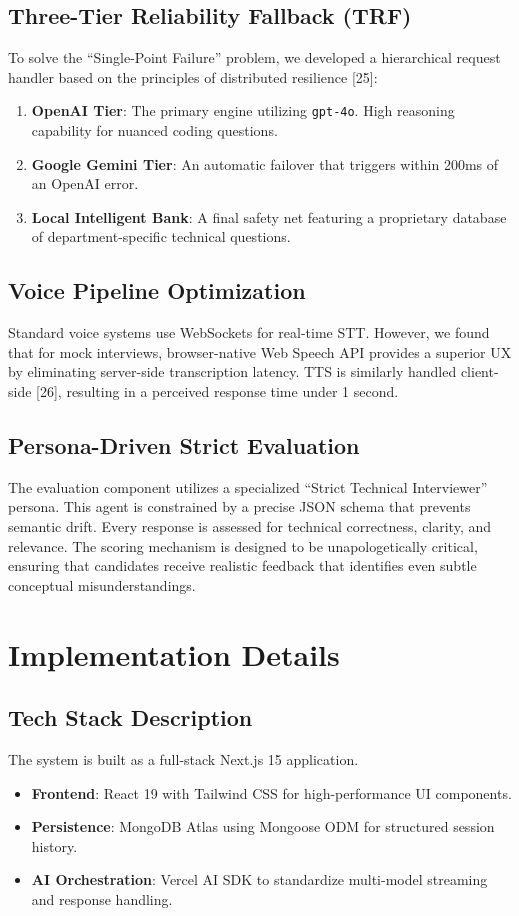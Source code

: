\documentclass[conference]{IEEEtran}
\begin{document}
\subsection{Three-Tier Reliability Fallback (TRF)}
To solve the ``Single-Point Failure'' problem, we developed a hierarchical request handler based on the principles of distributed resilience [25]:
\begin{enumerate}
    \item \textbf{OpenAI Tier}: The primary engine utilizing \texttt{gpt-4o}. High reasoning capability for nuanced coding questions.
    \item \textbf{Google Gemini Tier}: An automatic failover that triggers within 200ms of an OpenAI error.
    \item \textbf{Local Intelligent Bank}: A final safety net featuring a proprietary database of department-specific technical questions.
\end{enumerate}

\subsection{Voice Pipeline Optimization}
Standard voice systems use WebSockets for real-time STT. However, we found that for mock interviews, browser-native Web Speech API provides a superior UX by eliminating server-side transcription latency. TTS is similarly handled client-side [26], resulting in a perceived response time under 1 second.

\subsection{Persona-Driven Strict Evaluation}
The evaluation component utilizes a specialized ``Strict Technical Interviewer'' persona. This agent is constrained by a precise JSON schema that prevents semantic drift. Every response is assessed for technical correctness, clarity, and relevance. The scoring mechanism is designed to be unapologetically critical, ensuring that candidates receive realistic feedback that identifies even subtle conceptual misunderstandings.

\section{Implementation Details}

\subsection{Tech Stack Description}
The system is built as a full-stack Next.js 15 application. 
\begin{itemize}
    \item \textbf{Frontend}: React 19 with Tailwind CSS for high-performance UI components.
    \item \textbf{Persistence}: MongoDB Atlas using Mongoose ODM for structured session history.
    \item \textbf{AI Orchestration}: Vercel AI SDK to standardize multi-model streaming and response handling.
\end{itemize}
\end{document}
